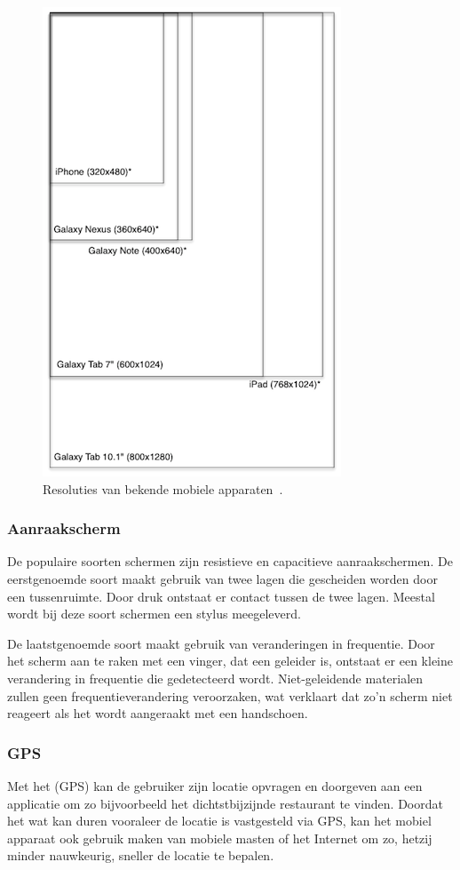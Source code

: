 \begin{figure}
  \centering
  \includegraphics[height=0.8\textwidth]{figuren/mobile-devices-resolutions.png}
  \caption{Resoluties van bekende mobiele apparaten~\cite{Wolfermann2012}.}
  \label{fig:resoluties}
\end{figure}

\subsubsection{Aanraakscherm}
De populaire soorten schermen zijn resistieve en capacitieve aanraakschermen. 
De eerstgenoemde soort maakt gebruik van twee lagen die gescheiden worden door een tussenruimte. 
Door druk ontstaat er contact tussen de twee lagen. 
Meestal wordt bij deze soort schermen een stylus meegeleverd. 

De laatstgenoemde soort maakt gebruik van veranderingen in frequentie. 
Door het scherm aan te raken met een vinger, dat een geleider is, ontstaat er een kleine verandering in frequentie die gedetecteerd wordt. 
Niet-geleidende materialen zullen geen frequentieverandering veroorzaken, wat verklaart dat zo'n scherm niet reageert als het wordt aangeraakt met een handschoen.

\subsubsection{GPS}
Met het  (GPS) kan de gebruiker zijn locatie opvragen en doorgeven aan een applicatie om zo bijvoorbeeld het dichtstbijzijnde restaurant te vinden. 
Doordat het wat kan duren vooraleer de locatie is vastgesteld via GPS, kan het mobiel apparaat ook gebruik maken van mobiele masten of het Internet om zo, hetzij minder nauwkeurig, sneller de locatie te bepalen.

